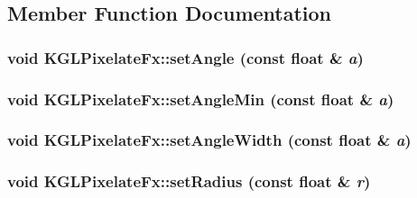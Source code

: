 \subsection{Member Function Documentation}
\hypertarget{class_k_g_l_pixelate_fx_204ec29ca116f9fd7ba83b0d269529b6}{
\subsubsection[{setAngle}]{\setlength{\rightskip}{0pt plus 5cm}void KGLPixelateFx::setAngle (const float \& {\em a})}}
\label{class_k_g_l_pixelate_fx_204ec29ca116f9fd7ba83b0d269529b6}


\hypertarget{class_k_g_l_pixelate_fx_fec0e778766d9ef081b3d676b90993f4}{
\subsubsection[{setAngleMin}]{\setlength{\rightskip}{0pt plus 5cm}void KGLPixelateFx::setAngleMin (const float \& {\em a})}}
\label{class_k_g_l_pixelate_fx_fec0e778766d9ef081b3d676b90993f4}


\hypertarget{class_k_g_l_pixelate_fx_4f4806fa9000a7d9cb1b299107d4bdb2}{
\subsubsection[{setAngleWidth}]{\setlength{\rightskip}{0pt plus 5cm}void KGLPixelateFx::setAngleWidth (const float \& {\em a})}}
\label{class_k_g_l_pixelate_fx_4f4806fa9000a7d9cb1b299107d4bdb2}


\hypertarget{class_k_g_l_pixelate_fx_78842d2a1c034c8144688a07205b8c14}{
\subsubsection[{setRadius}]{\setlength{\rightskip}{0pt plus 5cm}void KGLPixelateFx::setRadius (const float \& {\em r})}}
\label{class_k_g_l_pixelate_fx_78842d2a1c034c8144688a07205b8c14}


